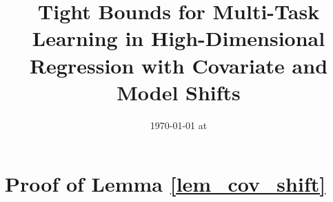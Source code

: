 \documentclass{article}
\begin{document}
\title{Tight Bounds for Multi-Task Learning in High-Dimensional Regression with Covariate and Model Shifts}
\date{}
\maketitle
\date{{\ddmmyyyydate\today} at \currenttime}












%


\appendix

\section{Proof of Lemma \ref{lem_cov_shift}} %

%
\end{document}
